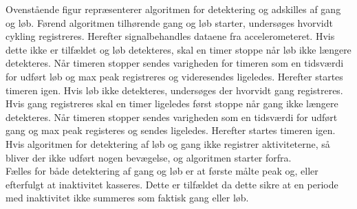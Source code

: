 Ovenstående figur repræsenterer algoritmen for detektering og adskilles af gang og løb. Førend algoritmen tilhørende gang og løb starter, undersøges hvorvidt cykling registreres. Herefter signalbehandles dataene fra accelerometeret. Hvis dette ikke er tilfældet og løb detekteres, skal en timer stoppe når løb ikke længere detekteres. Når timeren stopper sendes varigheden for timeren som en tidsværdi for udført løb og max peak registreres og videresendes ligeledes. Herefter startes timeren igen. Hvis løb ikke detekteres, undersøges der hvorvidt gang registreres. Hvis gang registreres skal en timer ligeledes først stoppe når gang ikke længere detekteres. Når timeren stopper sendes varigheden som en tidsværdi for udført gang og max peak registeres og sendes ligeledes. Herefter startes timeren igen. Hvis algoritmen for detektering af løb og gang ikke registrer aktiviteterne, så bliver der ikke udført nogen bevægelse, og algoritmen starter forfra. \\
Fælles for både detektering af gang og løb er at første målte peak og, eller efterfulgt at inaktivitet kasseres. Dette er tilfældet da dette sikre at en periode med inaktivitet ikke summeres som faktisk gang eller løb. 

